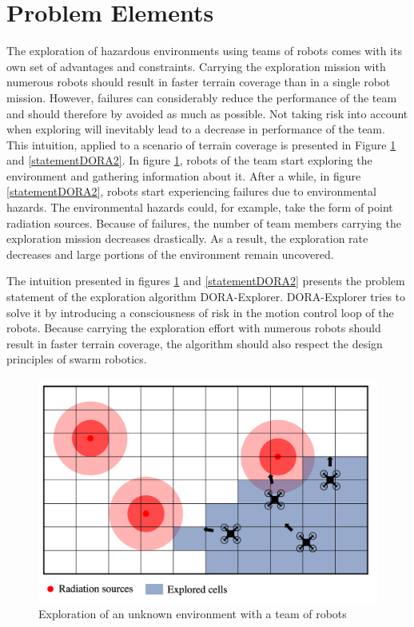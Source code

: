 \section{Problem Elements}
The exploration of hazardous environments using teams of robots comes with its own set of advantages and constraints. Carrying the exploration mission with numerous robots should result in faster terrain coverage than in a single robot mission.  However, failures can considerably reduce the performance of the team and should therefore by avoided as much as possible. Not taking risk into account when exploring will inevitably lead to a decrease in performance of the team. This intuition, applied to a scenario of terrain coverage is presented in Figure \ref{statementDORA1} and \ref{statementDORA2}. In figure \ref{statementDORA1}, robots of the team start exploring the environment and gathering information about it. After a while, in figure \ref{statementDORA2}, robots start experiencing failures due to environmental hazards. The environmental hazards could, for example, take the form of point radiation sources. Because of failures, the number of team members carrying the exploration mission decreases drastically. As a result, the exploration rate decreases and large portions of the environment remain uncovered. 

The intuition presented in figures \ref{statementDORA1} and \ref{statementDORA2} presents the problem statement of the exploration algorithm DORA-Explorer. DORA-Explorer tries to solve it by introducing a consciousness of risk in the motion control loop of the robots. Because carrying the exploration effort with numerous robots should result in faster terrain coverage, the algorithm should also respect the design principles of swarm robotics.

\begin{figure}[H]
	\centering
    \includegraphics[width=0.85\columnwidth]{images/problemStatement1.png}
    \caption{Exploration of an unknown environment with a team of robots}
    \label{statementDORA1}
\end{figure}

